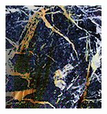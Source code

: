\begin{figure}[]
\begin{subfigure}{0.6\textwidth}
\begin{subfigure}{0.48\textwidth}
            \hfill
            \begin{subfigure}{0.6\textwidth}
                \centering
                \includegraphics[width=\textwidth]{images/04-experiment02/human/marble/pixel_proj_crop_green.jpeg}
                \caption*{}
            \end{subfigure}


\end{subfigure}
\end{subfigure}
\end{figure}
